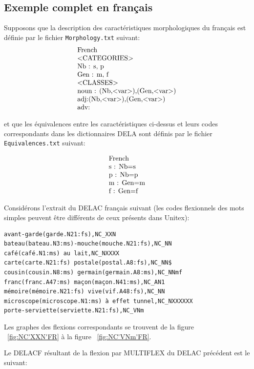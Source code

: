 \subsection{Exemple complet en français}
Supposons que la description des caractéristiques morphologiques du français est définie par le
fichier \verb+Morphology.txt+ suivant:
\[
\begin{array}[l]{l}
$French$ \\
$<CATEGORIES>$ \\
$Nb : s, p$ \\
$Gen : m, f$ \\
$<CLASSES>$ \\
$noun : (Nb,<var>),(Gen,<var>)$ \\
$adj:(Nb,<var>),(Gen,<var>)$ \\
$adv:$
\end{array}
\]

\bigskip
\noindent et que les équivalences entre les caractéristiques ci-dessus et leurs codes correspondants
dans les dictionnaires DELA sont définis par le fichier \verb+Equivalences.txt+ suivant:

\[
\begin{array}[l]{l}
$French$ \\
$s : Nb=s$ \\
$p : Nb=p$ \\
$m : Gen=m$ \\
$f : Gen=f$
\end{array}
\]

\bigskip
\noindent Considérons l'extrait du DELAC français suivant (les codes flexionnels des mots simples
peuvent être différents de ceux présents dans Unitex):

\begin{verbatim}
avant-garde(garde.N21:fs),NC_XXN
bateau(bateau.N3:ms)-mouche(mouche.N21:fs),NC_NN
café(café.N1:ms) au lait,NC_NXXXX
carte(carte.N21:fs) postale(postal.A8:fs),NC_NN$
cousin(cousin.N8:ms) germain(germain.A8:ms),NC_NNmf
franc(franc.A47:ms) maçon(maçon.N41:ms),NC_AN1
mémoire(mémoire.N21:fs) vive(vif.A48:fs),NC_NN
microscope(microscope.N1:ms) à effet tunnel,NC_NXXXXXX
porte-serviette(serviette.N21:fs),NC_VNm
\end{verbatim}


\bigskip
\noindent Les graphes des flexions correspondants se trouvent de la figure ~\ref{fig:NC'XXN'FR} à la
figure ~\ref{fig:NC'VNm'FR}. 

\bigskip
\noindent Le DELACF résultant de la flexion par MULTIFLEX du DELAC précédent est le suivant:

